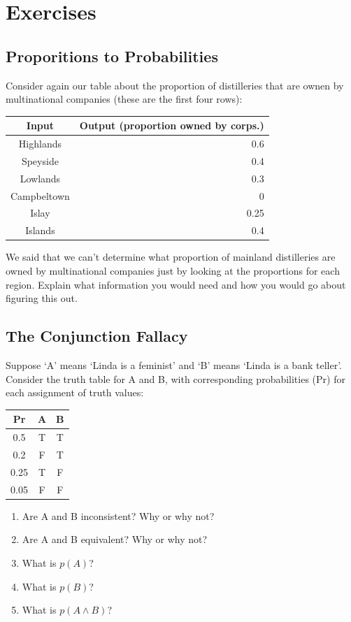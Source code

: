 \documentclass[]{tufte-book}
\begin{document}
\hypertarget{exercises-7}{%
\section{Exercises}\label{exercises-7}}

\hypertarget{proporitions-to-probabilities}{%
\subsection{Proporitions to Probabilities}\label{proporitions-to-probabilities}}

Consider again our table about the proportion of distilleries that are ownen by multinational companies (these are the first four rows):

\begin{longtable}[]{@{}cr@{}}
\toprule
Input & Output (proportion owned by corps.)\tabularnewline
\midrule
\endhead
Highlands & 0.6\tabularnewline
Speyside & 0.4\tabularnewline
Lowlands & 0.3\tabularnewline
Campbeltown & 0\tabularnewline
Islay & 0.25\tabularnewline
Islands & 0.4\tabularnewline
\bottomrule
\end{longtable}

We said that we can't determine what proportion of mainland distilleries are owned by multinational companies just by looking at the proportions for each region. Explain what information you would need and how you would go about figuring this out.

\hypertarget{the-conjunction-fallacy}{%
\subsection{The Conjunction Fallacy}\label{the-conjunction-fallacy}}

Suppose `A' means `Linda is a feminist' and `B' means `Linda is a bank teller'. Consider the truth table for A and B, with corresponding probabilities (Pr) for each assignment of truth values:

\begin{longtable}[]{@{}ccc@{}}
\toprule
Pr & A & B\tabularnewline
\midrule
\endhead
0.5 & T & T\tabularnewline
0.2 & F & T\tabularnewline
0.25 & T & F\tabularnewline
0.05 & F & F\tabularnewline
\bottomrule
\end{longtable}

\begin{enumerate}
\def\labelenumi{\arabic{enumi}.}
\item
  Are A and B inconsistent? Why or why not?
\item
  Are A and B equivalent? Why or why not?
\item
  What is \(p(A)\)?
\item
  What is \(p(B)\)?
\item
  What is \(p(A\wedge B)\)?
\end{enumerate}
\end{document}
